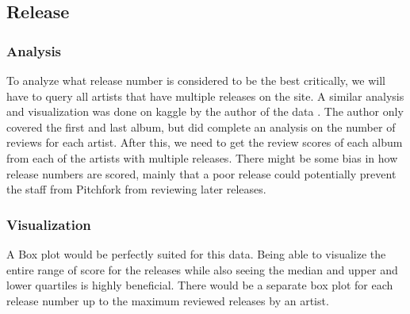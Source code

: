 \documentclass{article}
\begin{document}
\subsection{Release}\label{release}

\subsubsection{Analysis}\label{analysis-1}

To analyze what release number is considered to be the best critically,
we will have to query all artists that have multiple releases on the
site. A similar analysis and visualization was done on kaggle by the
author of the data \citep{kaggleFirst}. The author only covered the
first and last album, but did complete an analysis on the number of
reviews for each artist. After this, we need to get the review scores of
each album from each of the artists with multiple releases. There might
be some bias in how release numbers are scored, mainly that a poor
release could potentially prevent the staff from Pitchfork from
reviewing later releases.

\subsubsection{Visualization}\label{visualization-1}

A Box plot would be perfectly suited for this data. Being able to
visualize the entire range of score for the releases while also seeing
the median and upper and lower quartiles is highly beneficial. There
would be a separate box plot for each release number up to the maximum
reviewed releases by an artist.



\end{document}
